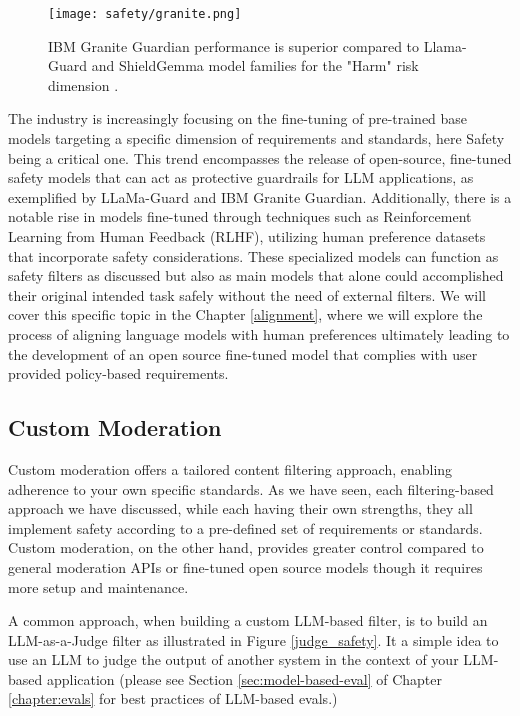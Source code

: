 \begin{figure}[H]
\centering
\texttt{[image: safety/granite.png]}
\caption{IBM Granite Guardian performance is superior compared to Llama-Guard and ShieldGemma model families for the "Harm" risk dimension \cite{padhi2024graniteguardian}.}
\label{granite}
\end{figure}

The industry is increasingly focusing on the fine-tuning of pre-trained base models targeting a specific dimension of requirements and standards, here Safety being a critical one. This trend encompasses the release of open-source, fine-tuned safety models that can act as protective guardrails for LLM applications, as exemplified by LLaMa-Guard and IBM Granite Guardian. Additionally, there is a notable rise in models fine-tuned through techniques such as Reinforcement Learning from Human Feedback (RLHF), utilizing human preference datasets that incorporate safety considerations. These specialized models can function as safety filters as discussed but also as main models that alone could accomplished their original intended task safely without the need of external filters. We will cover this specific topic in the Chapter \ref{alignment}, where we will explore the process of aligning language models with human preferences ultimately leading to the development of an open source fine-tuned model that complies with user provided policy-based requirements.

\subsection{Custom Moderation}
\label{custom-moderation}

Custom moderation offers a tailored content filtering approach, enabling adherence to your own specific standards. As we have seen, each filtering-based approach we have discussed, while each having their own strengths, they all implement safety according to a pre-defined set of requirements or standards. Custom moderation, on the other hand, provides greater control compared to general moderation APIs or fine-tuned open source models though it requires more setup and maintenance. 

A common approach, when building a custom LLM-based filter, is to build an LLM-as-a-Judge filter as illustrated in Figure \ref{judge_safety}. It a simple idea to use an LLM to judge the output of another system in the context of your LLM-based application (please see Section \ref{sec:model-based-eval} of Chapter \ref{chapter:evals} for best practices of LLM-based evals.)

